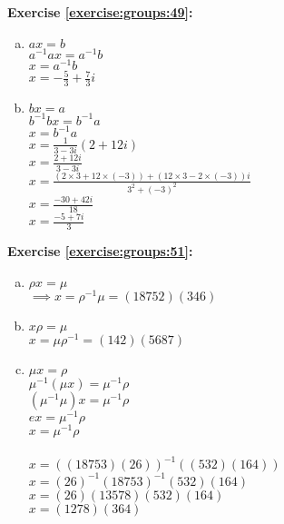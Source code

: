 \noindent\textbf{Exercise \ref{exercise:groups:49}:}
\begin{enumerate}[(a)]
\item
$ax=b$\\
$a^{-1}ax=a^{-1}b$\\
$x=a^{-1}b$\\
$x = -\frac{5}{3} + \frac{7}{3}i$


\item
$bx = a$\\ 
$b^{-1}bx = b^{-1}a$\\
$x = b^{-1}a$\\
$x = \frac{1}{3 - 3i}(2 + 12i)$\\
$x = \frac{2 + 12i}{3 - 3i}$\\
$x = \frac{(2 \times 3 + 12 \times (-3)) + (12 \times 3 - 2 \times (-3))i}{3^2 + (-3)^2}$\\
$x = \frac{-30 + 42i}{18}$\\
$x = \frac{-5 + 7i}{3}$
\end{enumerate}

\noindent\textbf{Exercise \ref{exercise:groups:51}:}
\begin{enumerate}[(a)]
\item
$\rho x=\mu$\\
$\implies x=\rho^{-1}\mu=(18752)(346)$\\

\item
$x \rho = \mu$\\
$x=\mu\rho^{-1}=(142)(5687)$

\item
$\mu x = \rho$\\
$\mu^{-1}(\mu x) = \mu^{-1}\rho$\\
$(\mu^{-1}\mu)x = \mu^{-1}\rho$\\
$ex = \mu^{-1}\rho$\\
$x = \mu^{-1}\rho$\\
\\
$x = ((18753)(26))^{-1}((532)(164))$\\
$x = (26)^{-1}(18753)^{-1}(532)(164)$\\
$x = (26)(13578)(532)(164)$\\
$x = (1278)(364)$
\end{enumerate}

